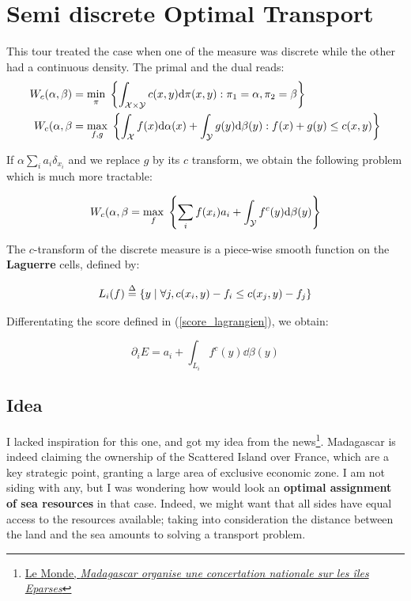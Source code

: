 \section{Semi discrete Optimal Transport}

This tour treated the case when one of the measure was discrete while the other had a continuous density. The primal and the dual reads: 
\begin{align*}
    W_c(\alpha,\beta) &= \underset{\pi}{\min}\; \left\{ 
    \int_{\mathcal{X} \times \mathcal{Y}} c(x, y) \mathrm{d} \pi(x,y) : \pi_1 = \alpha, \pi_2 = \beta
     \right\} \\
    W_c(\alpha, \beta &= \underset{f, g}{\max}\; \left\{ 
    \int_{\mathcal{X}} f(x) \mathrm{d} \alpha (x) + \int_{\mathcal{Y}} g(y) \mathrm{d} \beta (y) : f(x) + g(y) \leq c(x,y)
     \right\}
\end{align*}

If $\alpha \sum_i a_i \delta_{x_i}$ and we replace $g$ by its $c$ transform, we obtain the following problem which is much more tractable:

\begin{equation}
\label{score_lagrangien}
    W_c(\alpha, \beta = \underset{f}{\max}\; \left\{ 
    \sum_i f(x_i) a_i + \int_{\mathcal{Y}} f^c(y) \mathrm{d} \beta (y)
     \right\}
\end{equation}

The $c$-transform of the discrete measure is a piece-wise smooth function on the \textbf{Laguerre} cells, defined by:

\begin{equation}
    L_i(f) \stackrel{\Delta}{=} \left\{ y \; | \; \forall j, c(x_i,y) - f_i \leq c(x_j,y) - f_j  \right\}
\end{equation}

Differentating the score defined in (\ref{score_lagrangien}), we obtain: 

\begin{equation}
    \partial_i E = a_i + \int_{L_i} f^c(y) \dd \beta(y)
\end{equation}

\subsection{Idea}

I lacked inspiration for this one, and got my idea from the news\footnote{\href{https://www.lemonde.fr/afrique/article/2019/12/09/madagascar-organise-une-concertation-nationale-sur-les-iles-eparses_6022235_3212.html}{Le Monde, \textit{Madagascar organise une concertation nationale sur les îles Eparses}}}. Madagascar is indeed claiming the ownership of the Scattered Island over France, which are a key strategic point, granting a large area of exclusive economic zone. I am not siding with any, but I was wondering how would look an \textbf{optimal assignment of sea resources} in that case. Indeed, we might want that all sides have equal access to the resources available; taking into consideration the distance between the land and the sea amounts to solving a transport problem. 

